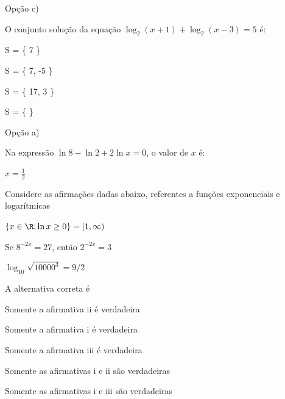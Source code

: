 \begin{exercises*}
\begin{exercise}
  \begin{answer}
    Opção c)
  \end{answer}
\end{exercise}

\begin{exercise}
  O conjunto solução da equação $\log_2(x + 1) + \log_2(x-3) = 5$ é:
  \begin{mathlist}
    \item S = \{ 7 \}
    \item S = \{ 7, -5 \}
    \item S = \{ 17, 3 \}
    \item S = \{  \}
  \end{mathlist}

  \begin{answer}
    Opção a)
  \end{answer}
\end{exercise}

\begin{exercise}
  Na expressão $\ln 8-\ln 2 + 2\ln x = 0$, o valor de $x$ é:

  \begin{answer}
    $x =\frac{1}{2}$
  \end{answer}
\end{exercise}

\begin{exercise}
  Considere as afirmações dadas abaixo,
  referentes a funções exponenciais e logarítmicas
  \begin{romanlist}
    \item $\{x\in\R;\ln x\geq 0\}=[1,\infty)$
    \item Se $8^{-2x}=27$, então $2^{-2x}=3$
    \item $\log_{10}\sqrt{10000^3}=9/2$
  \end{romanlist}
  A alternativa correta é
  \begin{alphalist}
    \item Somente a afirmativa ii é verdadeira
    \item Somente a afirmativa i é verdadeira
    \item Somente a afirmativa iii é verdadeira
    \item Somente as afirmativas i e ii são verdadeiras
    \item Somente as afirmativas i e iii são verdadeiras
  \end{alphalist}


\end{exercise}
\end{exercises*}
